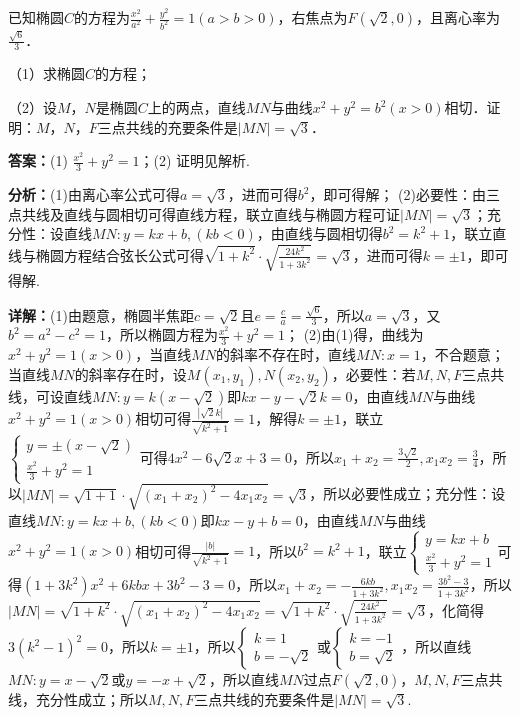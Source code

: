 \begin{question}[points=12]
已知椭圆$C$的方程为$\frac{x^2}{a^2}+\frac{y^2}{b^2}=1(a>b>0)$，右焦点为$F(\sqrt{2},0)$，且离心率为$\frac{\sqrt{6}}{3}$．

（1）求椭圆$C$的方程；

（2）设$M$，$N$是椭圆$C$上的两点，直线$MN$与曲线$x^2+y^2=b^2(x>0)$相切．证明：$M$，$N$，$F$三点共线的充要条件是$|MN|=\sqrt{3}$．
\begin{solution}
\textbf{答案：}(1) $\frac{x^2}{3}+y^2=1$；(2) 证明见解析.

\textbf{分析：}(1)由离心率公式可得$a=\sqrt{3}$，进而可得$b^2$，即可得解； (2)必要性：由三点共线及直线与圆相切可得直线方程，联立直线与椭圆方程可证$|MN|=\sqrt{3}$；充分性：设直线$MN:y=kx+b,(kb<0)$，由直线与圆相切得$b^2=k^2+1$，联立直线与椭圆方程结合弦长公式可得$\sqrt{1+k^2}\cdot\sqrt{\frac{24k^2}{1+3k^2}}=\sqrt{3}$，进而可得$k=\pm1$，即可得解.

\textbf{详解：}(1)由题意，椭圆半焦距$c=\sqrt{2}$且$e=\frac{c}{a}=\frac{\sqrt{6}}{3}$，所以$a=\sqrt{3}$，又$b^2=a^2-c^2=1$，所以椭圆方程为$\frac{x^2}{3}+y^2=1$； (2)由(1)得，曲线为$x^2+y^2=1(x>0)$，当直线$MN$的斜率不存在时，直线$MN:x=1$，不合题意；当直线$MN$的斜率存在时，设$M(x_1,y_1),N(x_2,y_2)$，必要性：若$M,N,F$三点共线，可设直线$MN:y=k(x-\sqrt{2})$即$kx-y-\sqrt{2}k=0$，由直线$MN$与曲线$x^2+y^2=1(x>0)$相切可得$\frac{|\sqrt{2}k|}{\sqrt{k^2+1}}=1$，解得$k=\pm1$，联立$\begin{cases} y=\pm(x-\sqrt{2}) \\ \frac{x^2}{3}+y^2=1 \end{cases}$可得$4x^2-6\sqrt{2}x+3=0$，所以$x_1+x_2=\frac{3\sqrt{2}}{2},x_1x_2=\frac{3}{4}$，所以$|MN|=\sqrt{1+1}\cdot\sqrt{(x_1+x_2)^2-4x_1x_2}=\sqrt{3}$，所以必要性成立；充分性：设直线$MN:y=kx+b,(kb<0)$即$kx-y+b=0$，由直线$MN$与曲线$x^2+y^2=1(x>0)$相切可得$\frac{|b|}{\sqrt{k^2+1}}=1$，所以$b^2=k^2+1$，联立$\begin{cases} y=kx+b \\ \frac{x^2}{3}+y^2=1 \end{cases}$可得$(1+3k^2)x^2+6kbx+3b^2-3=0$，所以$x_1+x_2=-\frac{6kb}{1+3k^2},x_1x_2=\frac{3b^2-3}{1+3k^2}$，所以$|MN|=\sqrt{1+k^2}\cdot\sqrt{(x_1+x_2)^2-4x_1x_2}=\sqrt{1+k^2}\cdot\sqrt{\frac{24k^2}{1+3k^2}}=\sqrt{3}$，化简得$3(k^2-1)^2=0$，所以$k=\pm1$，所以$\begin{cases} k=1 \\ b=-\sqrt{2} \end{cases}$或$\begin{cases} k=-1 \\ b=\sqrt{2} \end{cases}$，所以直线$MN:y=x-\sqrt{2}$或$y=-x+\sqrt{2}$，所以直线$MN$过点$F(\sqrt{2},0)$，$M,N,F$三点共线，充分性成立；所以$M,N,F$三点共线的充要条件是$|MN|=\sqrt{3}$.
\end{solution}
\end{question}


